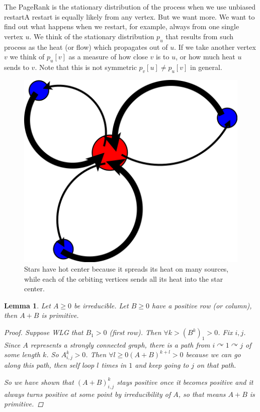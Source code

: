\documentclass[a4paper,10pt]{article}
\newcommand{\gt}{>}
\theoremstyle{definition}
\theoremstyle{remark}
\theoremstyle{plain}
\newtheorem{lemma}{Lemma}[section]
\begin{document}
The PageRank is the stationary distribution of the process when we use unbiased
restart\textemdash A restart is equally likely from any vertex.
But we want more. We want to find out what happens when we restart, for example,
always from one single vertex $u$. We think of the stationary distribution $p_u$ that 
results from such process as the heat (or flow) which propagates out of $u$.
If we take another vertex $v$ we think of $p_u[v]$ as a measure of how close $v$
is to $u$, or how much heat $u$ sends to $v$.
Note that this is not symmetric $p_v[u] \neq p_u[v]$ in general.


\begin{figure}[!htb]
\centering
\includegraphics[width=0.55\linewidth]{diagram_star.png}
\caption{Stars have hot center because it spreads its heat on many sources,
while each of the orbiting vertices sends all its heat into the star center.
}
\label{fig:hotstar}
\end{figure}

\begin{lemma}
\label{lem:AplusP}
Let $A \geq 0$ be irreducible. Let $B \geq 0$ have a positive row (or column),
then $A + B$ is primitive.
\begin{proof}
Suppose WLG that $B_1 > 0$ (first row). Then $\forall k \gt (B^k)_1 \gt 0$.
Fix $i,j$.
Since $A$ represents a strongly connected graph, there is a path from $i
\curvearrowright 1 \curvearrowright j$ of some length $k$. So $A^k_{i,j}>0$.
Then $\forall l \geq 0 (A + B)^{k+l} \gt 0$ because we can go along this path,
then self loop $l$ times in $1$ and keep going to $j$ on that path.

So we have shown that $(A+B)^k_{i,j}$ stays positive once it becomes positive
and it always turns positive at some point by irreducibility of $A$, so that
means $A+B$ is primitive.
\end{proof}
\end{lemma}
\end{document}
